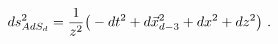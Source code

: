 \begin{equation}
ds^2_{AdS_d} = {1\over z^2} 
 \big( -dt^2 + d\vec{x}_{d-3}^2 +dx^2 + dz^2\big)\ .
\label{adseight}
\end{equation}

